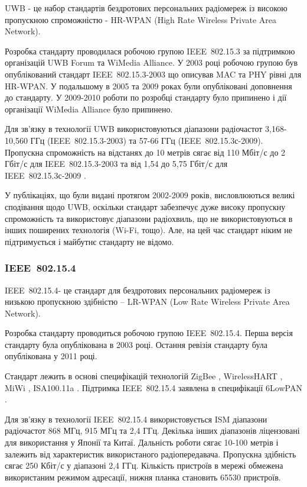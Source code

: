 \documentclass[a4paper,ukrainian,utf8,nocolumnsxix,floatsection,equationsection]{eskdtext}
\renewcommand\paragraph{\subsubsection}
\newcommand{\iee}[0]{IEEE~802.15.4\xspace}
\newcommand{\engtxt}[1]{\foreignlanguage{english}{#1}}
\begin{document}
UWB - це набор стандартів бездротових персональних радіомереж із високою пропускною спроможністю - HR-WPAN (High Rate Wireless Private Area Network).

Розробка стандарту проводилася робочою групою IEEE~802.15.3 за підтримкою організацій UWB Forum та WiMedia Alliance. У 2003 році робочою групою був опублікований стандарт IEEE~802.15.3-2003 що описував MAC та PHY рівні для HR-WPAN. У подальшому в 2005 та 2009 роках були опубліковані доповнення до стандарту. У 2009-2010 роботи по розробці стандарту було припинено і дії організації WiMedia Alliance було припинено.

Для зв’язку в технології UWB використовуються діапазони радіочастот 3,168-10,560 ГГц (IEEE~802.15.3-2003)  та 57-66 ГГц (IEEE~802.15.3с-2009). Пропускна спроможність на відстанях до 10 метрів сягає від 110 Мбіт/с до 2 Гбіт/с для IEEE~802.15.3-2003 та від 1,54 до 5,75 Гбіт/с для IEEE~802.15.3с-2009 \cite{ieee802153:moba:approach,802154c:first:1gb:data:rate}.

У публікаціях, що були видані протягом 2002-2009 років, висловлюються великі сподівання щодо UWB, оскільки стандарт забезпечує дуже високу пропускну спроможність та використовує діапазони радіохвиль, що не використовуються в інших поширених технологія (Wi-Fi, тощо). Але, на цей час стандарт ніким не підтримується і майбутнє стандарту не відомо.


\paragraph{\iee} %
\label{par:iee}

\iee - це стандарт для бездротових персональних радіомереж із низькою пропускною здібністю – LR-WPAN (\engtxt{Low Rate Wireless Private Area Network}). 

Розробка стандарту проводиться робочою групою \iee. Перша версія стандарту була опублікована в 2003 році. Остання ревізія стандарту була опублікована у 2011 році. 

Стандарт лежить в основі специфікацій технологій ZigBee \cite{zigbee:core:spec}, WirelessHART \cite{wihart:zigbee:comparison}, MiWi \cite{microchip:miwi}, ISA100.11a \cite{wireless:evolution}. Підтримка \iee заявлена в специфікації 6LowPAN \cite{rfc6282}.

Для зв’язку в технології \iee використовується ISM діапазони радіочастот 868 МГц, 915 МГц та 2,4 ГГц. Декілька інших діапазонів ліцензовані для використання у Японії та Китаї. Дальність роботи сягає 10-100 метрів і залежить від характеристик використаного радіопередавача. Пропускна здібність сягає 250 Кбіт/с у діапазоні 2,4 ГГц. Кількість пристроїв в мережі обмежена використаним режимом адресації, нижня планка становить 65530 пристроїв.
\end{document}

